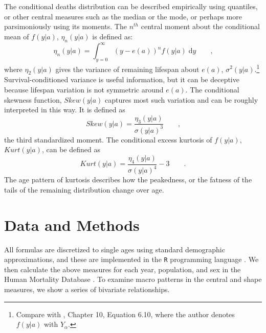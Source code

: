 \documentclass{article}
\newcommand{\dd}{\; \mathrm{d}}
\newcommand{\tc}{\quad\quad\text{,}}
\newcommand{\tp}{\quad\quad\text{.}}
\begin{document}
The conditional deaths distribution can be described empirically using
quantiles, or other central measures such as the median or the mode, or perhaps more parsimoniously using its moments.
The $n^{th}$ central moment about the conditional mean of $f(y|a)$,
$\eta_n(y|a)$ is defined as:
\begin{equation}
\eta _n(y|a) =  \int_{y=0}^\infty (y-e(a))^n f(y|a) \dd y \tc
\end{equation}
where $\eta_2(y|a)$ gives the variance of remaining lifespan about $e(a)$,
$\sigma^2(y|a)$.\footnote{Compare with \citet{chiang1984life}, Chapter 10,
Equation 6.10, where the author denotes $f(y|a)$ with $Y_\alpha$.}
Survival-conditioned variance is useful information, but it can be deceptive
because lifespan variation is not symmetric around $e(a)$. The
conditional skewness function, $Skew(y|a)$ captures most such variation and can be roughly interpreted in this way. It is defined as
\begin{equation}
\label{eq:skew}
Skew(y|a) = \frac{\eta _3(y|a)}{\sigma(y|a)^3} \tc
\end{equation}
the third standardized moment. The conditional excess
kurtosis of $f(y|a)$, $Kurt(y|a)$, can be defined as
\begin{equation}
\label{eq:kurt}
Kurt(y|a) = \frac{\eta_4(y|a)}{\sigma(y|a)^4}-3 \tp
\end{equation}
The age pattern of kurtosis describes how the peakedness, or the fatness of the
tails of the remaining distribution change over age. %

\section*{Data and Methods}
All formulas are discretized to single ages
using standard demographic approximations, and these are implemented in the
\texttt{R} programming language \citep{R}. We then calculate the above measures
for each year, population, and sex in the Human Mortality Database
. To examine macro patterns in the central and shape measures,
we show a series of bivariate relationships.
\end{document}
